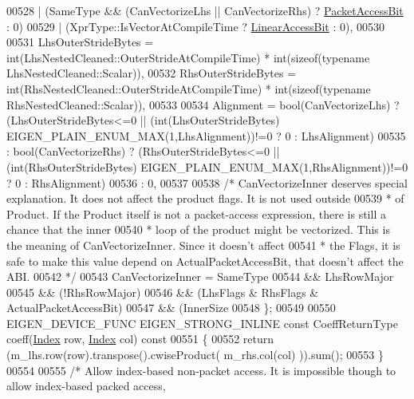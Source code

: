 \begin{DoxyCode}
00528           | (SameType && (CanVectorizeLhs || CanVectorizeRhs) ? \hyperlink{group__flags_ga1a306a438e1ab074e8be59512e887b9f}{PacketAccessBit} : 0)
00529           | (XprType::IsVectorAtCompileTime ? \hyperlink{group__flags_ga4b983a15d57cd55806df618ac544d09e}{LinearAccessBit} : 0),
00530           
00531     LhsOuterStrideBytes = int(LhsNestedCleaned::OuterStrideAtCompileTime) * int(\textcolor{keyword}{sizeof}(\textcolor{keyword}{typename} 
      LhsNestedCleaned::Scalar)),
00532     RhsOuterStrideBytes = int(RhsNestedCleaned::OuterStrideAtCompileTime) * int(\textcolor{keyword}{sizeof}(\textcolor{keyword}{typename} 
      RhsNestedCleaned::Scalar)),
00533 
00534     Alignment = bool(CanVectorizeLhs) ? (LhsOuterStrideBytes<=0 || (int(LhsOuterStrideBytes) %
      EIGEN\_PLAIN\_ENUM\_MAX(1,LhsAlignment))!=0 ? 0 : LhsAlignment)
00535               : bool(CanVectorizeRhs) ? (RhsOuterStrideBytes<=0 || (int(RhsOuterStrideBytes) %
      EIGEN\_PLAIN\_ENUM\_MAX(1,RhsAlignment))!=0 ? 0 : RhsAlignment)
00536               : 0,
00537 
00538     \textcolor{comment}{/* CanVectorizeInner deserves special explanation. It does not affect the product flags. It is not used
       outside}
00539 \textcolor{comment}{     * of Product. If the Product itself is not a packet-access expression, there is still a chance that
       the inner}
00540 \textcolor{comment}{     * loop of the product might be vectorized. This is the meaning of CanVectorizeInner. Since it doesn't
       affect}
00541 \textcolor{comment}{     * the Flags, it is safe to make this value depend on ActualPacketAccessBit, that doesn't affect the
       ABI.}
00542 \textcolor{comment}{     */}
00543     CanVectorizeInner =    SameType
00544                         && LhsRowMajor
00545                         && (!RhsRowMajor)
00546                         && (LhsFlags & RhsFlags & ActualPacketAccessBit)
00547                         && (InnerSize %
00548   \};
00549   
00550   EIGEN\_DEVICE\_FUNC EIGEN\_STRONG\_INLINE \textcolor{keyword}{const} CoeffReturnType coeff(\hyperlink{namespace_eigen_a62e77e0933482dafde8fe197d9a2cfde}{Index} row, 
      \hyperlink{namespace_eigen_a62e77e0933482dafde8fe197d9a2cfde}{Index} col)\textcolor{keyword}{ const}
00551 \textcolor{keyword}{  }\{
00552     \textcolor{keywordflow}{return} (m\_lhs.row(row).transpose().cwiseProduct( m\_rhs.col(col) )).sum();
00553   \}
00554 
00555   \textcolor{comment}{/* Allow index-based non-packet access. It is impossible though to allow index-based packed access,}

\end{DoxyCode}
